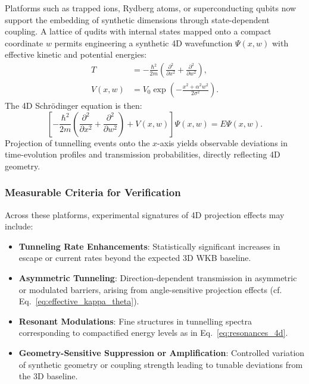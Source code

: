 \documentclass[12pt]{article}
\begin{document}
Platforms such as trapped ions, Rydberg atoms, or superconducting qubits now support the embedding of synthetic dimensions through state-dependent coupling. A lattice of qudits with internal states mapped onto a compact coordinate \( w \) permits engineering a synthetic 4D wavefunction \( \Psi(x, w) \) with effective kinetic and potential energies:
\begin{align}
T &= -\frac{\hbar^2}{2m} \left( \frac{\partial^2}{\partial x^2} + \frac{\partial^2}{\partial w^2} \right), \\
V(x, w) &= V_0 \exp\left( -\frac{x^2 + \alpha^2 w^2}{2\sigma^2} \right).
\end{align}
The 4D Schrödinger equation is then:
\begin{equation}
\left[ -\frac{\hbar^2}{2m} \left( \frac{\partial^2}{\partial x^2} + \frac{\partial^2}{\partial w^2} \right) + V(x, w) \right] \Psi(x, w) = E \Psi(x, w).
\label{eq:schrodinger_4d_simulator}
\end{equation}
Projection of tunnelling events onto the \( x \)-axis yields observable deviations in time-evolution profiles and transmission probabilities, directly reflecting 4D geometry.

\subsubsection*{Measurable Criteria for Verification}

Across these platforms, experimental signatures of 4D projection effects may include:

\begin{itemize}
    \item \textbf{Tunneling Rate Enhancements}: Statistically significant increases in escape or current rates beyond the expected 3D WKB baseline.
    \item \textbf{Asymmetric Tunneling}: Direction-dependent transmission in asymmetric or modulated barriers, arising from angle-sensitive projection effects (cf. Eq.~\eqref{eq:effective_kappa_theta}).
    \item \textbf{Resonant Modulations}: Fine structures in tunnelling spectra corresponding to compactified energy levels as in Eq.~\eqref{eq:resonances_4d}.
    \item \textbf{Geometry-Sensitive Suppression or Amplification}: Controlled variation of synthetic geometry or coupling strength leading to tunable deviations from the 3D baseline.
\end{itemize}
\end{document}
